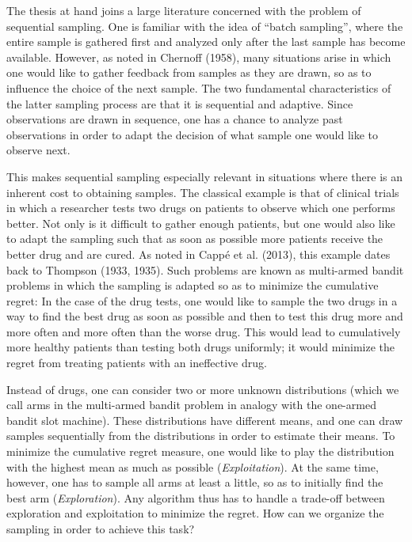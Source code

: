\documentclass[11pt,]{article}
\begin{document}
The thesis at hand joins a large literature concerned with the problem
of sequential sampling. One is familiar with the idea of ``batch
sampling'', where the entire sample is gathered first and analyzed only
after the last sample has become available. However, as noted in
Chernoff (1958), many situations arise in which one would like to gather
feedback from samples as they are drawn, so as to influence the choice
of the next sample. The two fundamental characteristics of the latter
sampling process are that it is sequential and adaptive. Since
observations are drawn in sequence, one has a chance to analyze past
observations in order to adapt the decision of what sample one would
like to observe next.

This makes sequential sampling especially relevant in situations where
there is an inherent cost to obtaining samples. The classical example is
that of clinical trials in which a researcher tests two drugs on
patients to observe which one performs better. Not only is it difficult
to gather enough patients, but one would also like to adapt the sampling
such that as soon as possible more patients receive the better drug and
are cured. As noted in Cappé et al. (2013), this example dates back to
Thompson (1933, 1935). Such problems are known as multi-armed bandit
problems in which the sampling is adapted so as to minimize the
cumulative regret: In the case of the drug tests, one would like to
sample the two drugs in a way to find the best drug as soon as possible
and then to test this drug more and more often and more often than the
worse drug. This would lead to cumulatively more healthy patients than
testing both drugs uniformly; it would minimize the regret from treating
patients with an ineffective drug.

Instead of drugs, one can consider two or more unknown distributions
(which we call arms in the multi-armed bandit problem in analogy with
the one-armed bandit slot machine). These distributions have different
means, and one can draw samples sequentially from the distributions in
order to estimate their means. To minimize the cumulative regret
measure, one would like to play the distribution with the highest mean
as much as possible (\emph{Exploitation}). At the same time, however,
one has to sample all arms at least a little, so as to initially find
the best arm (\emph{Exploration}). Any algorithm thus has to handle a
trade-off between exploration and exploitation to minimize the regret.
How can we organize the sampling in order to achieve this task?
\end{document}
